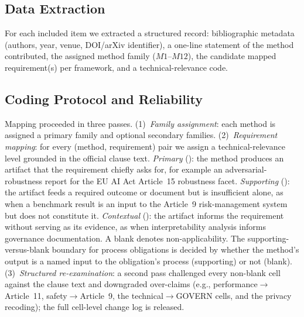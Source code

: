 \subsection{Data Extraction}
For each included item we extracted a structured record: bibliographic metadata (authors,
year, venue, DOI/arXiv identifier), a one-line statement of the method contributed, the
assigned method family ($M1$--$M12$), the candidate mapped requirement(s) per framework,
and a technical-relevance code.

\subsection{Coding Protocol and Reliability}
Mapping proceeded in three passes. (1)~\emph{Family assignment}: each method is assigned a
primary family and optional secondary families. (2)~\emph{Requirement mapping}: for every
(method, requirement) pair we assign a technical-relevance level grounded in the official
clause text. \emph{Primary} (\direct): the method produces an artifact that the requirement
chiefly asks for, for example an adversarial-robustness report for the EU AI Act Article~15
robustness facet. \emph{Supporting} (\partialev): the artifact feeds a required outcome or
document but is insufficient alone, as when a benchmark result is an input to the Article~9
risk-management system but does not constitute it. \emph{Contextual} (\indirect): the
artifact informs the requirement without serving as its evidence, as when interpretability
analysis informs governance documentation. A blank denotes non-applicability. The
supporting-versus-blank boundary for process obligations is decided by whether the method's
output is a named input to the obligation's process (supporting) or not (blank).
(3)~\emph{Structured re-examination}: a second pass challenged every non-blank cell against
the clause text and downgraded over-claims (e.g., performance$\rightarrow$Article~11,
safety$\rightarrow$Article~9, the technical$\rightarrow$GOVERN cells, and the privacy
recoding); the full cell-level change log is released.

